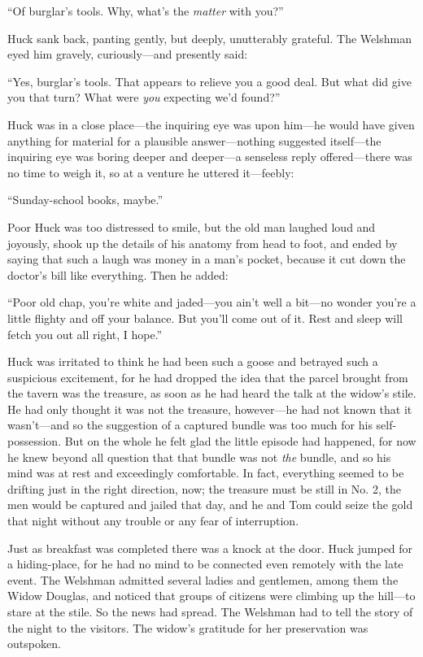 \documentclass{book}
\begin{document}
“Of burglar’s tools. Why, what’s the \emph{matter} with you?”

Huck sank back, panting gently, but deeply, unutterably grateful. The Welshman eyed him gravely, curiously—and presently said:

“Yes, burglar’s tools. That appears to relieve you a good deal. But what did give you that turn? What were \emph{you} expecting we’d found?”

Huck was in a close place—the inquiring eye was upon him—he would have given anything for material for a plausible answer—nothing suggested itself—the inquiring eye was boring deeper and deeper—a senseless reply offered—there was no time to weigh it, so at a venture he uttered it—feebly:

“Sunday-school books, maybe.”

Poor Huck was too distressed to smile, but the old man laughed loud and joyously, shook up the details of his anatomy from head to foot, and ended by saying that such a laugh was money in a man’s pocket, because it cut down the doctor’s bill like everything. Then he added:

“Poor old chap, you’re white and jaded—you ain’t well a bit—no wonder you’re a little flighty and off your balance. But you’ll come out of it. Rest and sleep will fetch you out all right, I hope.”

Huck was irritated to think he had been such a goose and betrayed such a suspicious excitement, for he had dropped the idea that the parcel brought from the tavern was the treasure, as soon as he had heard the talk at the widow’s stile. He had only thought it was not the treasure, however—he had not known that it wasn’t—and so the suggestion of a captured bundle was too much for his self-possession. But on the whole he felt glad the little episode had happened, for now he knew beyond all question that that bundle was not \emph{the} bundle, and so his mind was at rest and exceedingly comfortable. In fact, everything seemed to be drifting just in the right direction, now; the treasure must be still in No. 2, the men would be captured and jailed that day, and he and Tom could seize the gold that night without any trouble or any fear of interruption.

Just as breakfast was completed there was a knock at the door. Huck jumped for a hiding-place, for he had no mind to be connected even remotely with the late event. The Welshman admitted several ladies and gentlemen, among them the Widow Douglas, and noticed that groups of citizens were climbing up the hill—to stare at the stile. So the news had spread. The Welshman had to tell the story of the night to the visitors. The widow’s gratitude for her preservation was outspoken.
\end{document}
